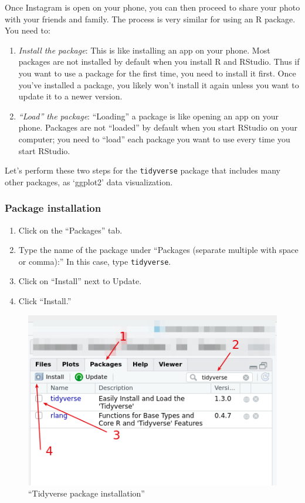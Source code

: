 \documentclass[
]{article}
\providecommand{\tightlist}{%
  \setlength{\itemsep}{0pt}\setlength{\parskip}{0pt}}
\begin{document}
Once Instagram is open on your phone, you can then proceed to share your
photo with your friends and family. The process is very similar for
using an R package. You need to:

\begin{enumerate}
\def\labelenumi{\arabic{enumi}.}
\tightlist
\item
  \emph{Install the package}: This is like installing an app on your
  phone. Most packages are not installed by default when you install R
  and RStudio. Thus if you want to use a package for the first time, you
  need to install it first. Once you've installed a package, you likely
  won't install it again unless you want to update it to a newer
  version.
\item
  \emph{``Load'' the package}: ``Loading'' a package is like opening an
  app on your phone. Packages are not ``loaded'' by default when you
  start RStudio on your computer; you need to ``load'' each package you
  want to use every time you start RStudio.
\end{enumerate}

Let's perform these two steps for the \texttt{tidyverse} package that
includes many other packages, as `ggplot2' data visualization.

\hypertarget{package-installation}{%
\subsubsection{Package installation}\label{package-installation}}

\begin{enumerate}
\def\labelenumi{\alph{enumi})}
\tightlist
\item
  Click on the ``Packages'' tab.
\item
  Type the name of the package under ``Packages (separate multiple with
  space or comma):'' In this case, type \texttt{tidyverse}.
\item
  Click on ``Install'' next to Update.
\item
  Click ``Install.''
\end{enumerate}

\begin{figure}
\centering
\includegraphics{../Figs/tidyverse01.png}
\caption{``Tidyverse package installation''}
\end{figure}
\end{document}
